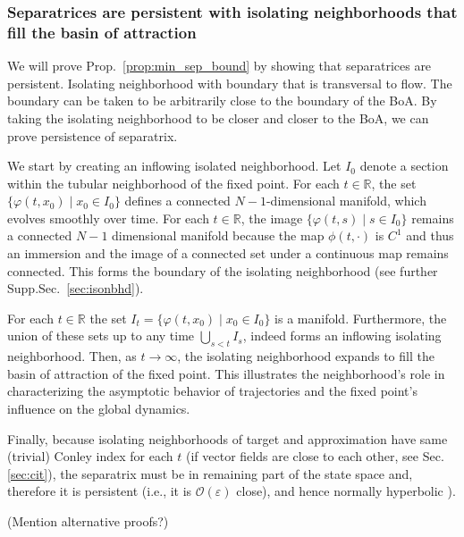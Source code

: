 \documentclass{article}
\newcommand{\ascomment}[1]{\textcolor{ascolor}{(#1)}}
\theoremstyle{definition} \newtheorem{definition}{Definition}
\theoremstyle{remark} \newtheorem{remark}{Remark}
\newcommand{\reals}{\mathbb{R}}
\newcounter{ct}
\begin{document}
\subsubsection{Separatrices are persistent with isolating neighborhoods that fill the basin of attraction}
We will prove Prop.~\ref{prop:min_sep_bound} by showing that separatrices are persistent.
Isolating neighborhood with boundary that is transversal to flow.
The boundary can be taken to be arbitrarily close to the boundary of the BoA.
By taking the isolating neighborhood to be closer and closer to the BoA, we can prove persistence of separatrix.

We start by creating an inflowing isolated neighborhood.
 Let $I_0$ denote a section within the tubular neighborhood of the fixed point.
For each $t\in\reals$, the set $\{\varphi(t,x_0) \mid x_0\in I_0\}$ defines a connected $N-1$-dimensional manifold, which evolves smoothly over time. 
For each \( t \in \reals \), the image \( \{ \varphi(t, s) \mid s \in I_0 \} \) remains a connected $N-1$ dimensional manifold because the map \( \phi(t, \cdot) \) is \( C^1 \) and thus an immersion and the image of a connected set under a continuous map remains connected.
This forms the boundary of the isolating neighborhood (see further Supp.Sec.~\ref{sec:isonbhd}).

For each $t\in\reals$ the set $I_t = \{\varphi(t,x_0) \mid x_0 \in I_0 \}$ is a manifold.
Furthermore, the union of these sets up to any time  $\bigcup_{s<t}I_s$, indeed forms an inflowing isolating neighborhood.
%
Then, as $t\rightarrow\infty$, the isolating neighborhood expands to fill the basin of attraction of the fixed point.
 This illustrates the neighborhood’s role in characterizing the asymptotic behavior of trajectories and the fixed point’s influence on the global dynamics.

Finally, because isolating neighborhoods of target and approximation have same (trivial) Conley index  for each $t$ (if vector fields are close to each other, see Sec.\ref{sec:cit}),
the separatrix must be in remaining part of the state space and, therefore it is persistent (i.e., it is $\mathcal{O}(\varepsilon)$ close), and hence normally hyperbolic \citep{mane1978persistent}).

\ascomment{Mention alternative proofs?}
\end{document}
